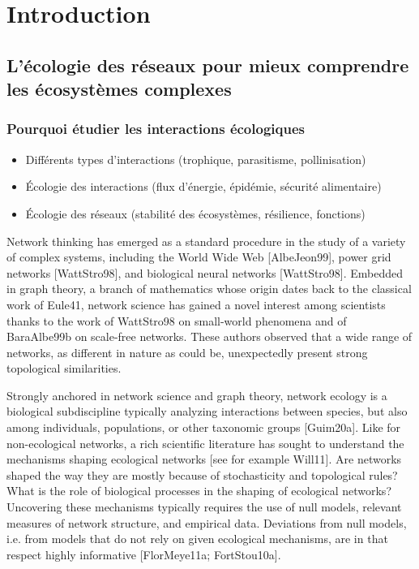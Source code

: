 
\francais   
\doublespacing
\chapter*{Introduction}



\section{L'écologie des réseaux pour mieux comprendre les écosystèmes complexes}

\subsection{Pourquoi étudier les interactions écologiques} 

\begin{itemize}
    \item Différents types d'interactions (trophique, parasitisme, pollinisation)
    \item Écologie des interactions (flux d'énergie, épidémie, sécurité alimentaire)
    \item Écologie des réseaux (stabilité des écosystèmes, résilience, fonctions)
\end{itemize}

Network thinking has emerged as a standard procedure in the study of a variety
of complex systems, including the World Wide Web [AlbeJeon99], power grid
networks [WattStro98], and biological neural networks [WattStro98]. Embedded
in graph theory, a branch of mathematics whose origin dates back to the
classical work of Eule41, network science has gained a novel interest among
scientists thanks to the work of WattStro98 on small-world phenomena and of
BaraAlbe99b on scale-free networks. These authors observed that a wide range of
networks, as different in nature as could be, unexpectedly present strong
topological similarities.

Strongly anchored in network science and graph theory, network ecology is a
biological subdiscipline typically analyzing interactions between species, but
also among individuals, populations, or other taxonomic groups [Guim20a]. Like
for non-ecological networks, a rich scientific literature has sought to
understand the mechanisms shaping ecological networks [see for example Will11].
Are networks shaped the way they are mostly because of stochasticity and
topological rules? What is the role of biological processes in the shaping of
ecological networks? Uncovering these mechanisms typically requires the use of
null models, relevant measures of network structure, and empirical data.
Deviations from null models, i.e. from models that do not rely on given
ecological mechanisms, are in that respect highly informative [FlorMeye11a;
FortStou10a].

